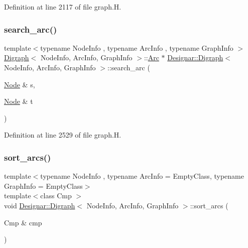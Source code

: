 Definition at line 2117 of file graph.\+H.

\mbox{\label{class_designar_1_1_digraph_ac301ebe5d45b2864639d68d7e9aeea2a}} 
\subsubsection{\texorpdfstring{search\+\_\+arc()}{search\_arc()}}
{\footnotesize\ttfamily template$<$typename Node\+Info , typename Arc\+Info , typename Graph\+Info $>$ \\
\hyperlink{class_designar_1_1_digraph}{Digraph}$<$ Node\+Info, Arc\+Info, Graph\+Info $>$\+::\hyperlink{class_designar_1_1_digraph_a0ceb278671f2a535c00fddccdeafd69f}{Arc} $\ast$ \hyperlink{class_designar_1_1_digraph}{Designar\+::\+Digraph}$<$ Node\+Info, Arc\+Info, Graph\+Info $>$\+::search\+\_\+arc (\begin{DoxyParamCaption}\item[{\hyperlink{class_designar_1_1_digraph_a4dc921c41a480b7946a04170e997d8ae}{Node} \&}]{s,  }\item[{\hyperlink{class_designar_1_1_digraph_a4dc921c41a480b7946a04170e997d8ae}{Node} \&}]{t }\end{DoxyParamCaption})}



Definition at line 2529 of file graph.\+H.

\mbox{\label{class_designar_1_1_digraph_a450085493969a382371f7d4d407e42cd}} 
\subsubsection{\texorpdfstring{sort\+\_\+arcs()}{sort\_arcs()}\hspace{0.1cm}{\footnotesize\ttfamily [1/2]}}
{\footnotesize\ttfamily template$<$typename Node\+Info , typename Arc\+Info  = Empty\+Class, typename Graph\+Info  = Empty\+Class$>$ \\
template$<$class Cmp $>$ \\
void \hyperlink{class_designar_1_1_digraph}{Designar\+::\+Digraph}$<$ Node\+Info, Arc\+Info, Graph\+Info $>$\+::sort\+\_\+arcs (\begin{DoxyParamCaption}\item[{Cmp \&}]{cmp }\end{DoxyParamCaption})\hspace{0.3cm}{\ttfamily [inline]}}




